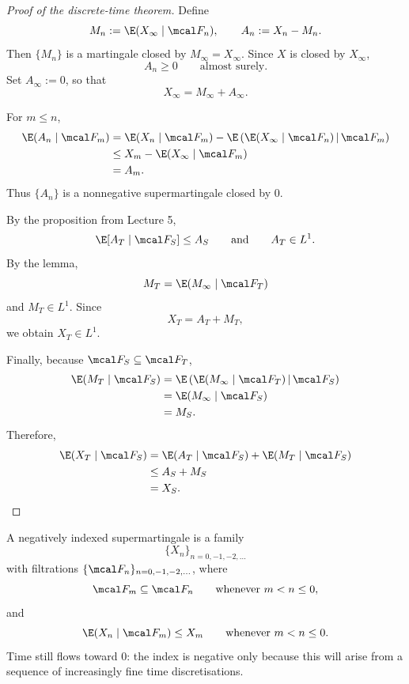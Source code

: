 \begin{proof}[Proof of the discrete-time theorem]
Define
\[
    M_n:=\E(X_\infty\mid\mcal F_n),
    \qquad
    A_n:=X_n-M_n.
\]
Then $\{M_n\}$ is a martingale closed by $M_\infty=X_\infty$. Since
$X$ is closed by $X_\infty$,
\[
    A_n\geq 0
    \qquad\text{almost surely.}
\]
Set $A_\infty:=0$, so that
\[
    X_\infty=M_\infty+A_\infty.
\]

For $m\leq n$,
\begin{align*}
    \E(A_n\mid\mcal F_m)
    &=
    \E(X_n\mid\mcal F_m)
    -
    \E\left(
        \E(X_\infty\mid\mcal F_n)
        \,\middle|\,\mcal F_m
    \right) \\
    &\leq
    X_m-\E(X_\infty\mid\mcal F_m) \\
    &=
    A_m.
\end{align*}
Thus $\{A_n\}$ is a nonnegative supermartingale closed by $0$.

By the proposition from Lecture 5,
\[
    \E[A_T\mid\mcal F_S]\leq A_S
    \qquad\text{and}\qquad
    A_T\in L^1.
\]
By the lemma,
\[
    M_T=\E(M_\infty\mid\mcal F_T)
\]
and $M_T\in L^1$. Since
\[
    X_T=A_T+M_T,
\]
we obtain $X_T\in L^1$.

Finally, because $\mcal F_S\subseteq\mcal F_T$,
\begin{align*}
    \E(M_T\mid\mcal F_S)
    &=
    \E\left(
        \E(M_\infty\mid\mcal F_T)
        \,\middle|\,\mcal F_S
    \right) \\
    &=
    \E(M_\infty\mid\mcal F_S) \\
    &=
    M_S.
\end{align*}
Therefore,
\begin{align*}
    \E(X_T\mid\mcal F_S)
    &=
    \E(A_T\mid\mcal F_S)
    +
    \E(M_T\mid\mcal F_S) \\
    &\leq A_S+M_S \\
    &=X_S.
\end{align*}
\end{proof}

\begin{definition}
A negatively indexed supermartingale is a family
\[
    \{X_n\}_{n=0,-1,-2,\ldots}
\]
with filtrations $\{\mcal F_n\}_{n=0,-1,-2,\ldots}$, where
\[
    \mcal F_m\subseteq\mcal F_n
    \qquad\text{whenever }m<n\leq 0,
\]
and
\[
    \E(X_n\mid\mcal F_m)\leq X_m
    \qquad\text{whenever }m<n\leq 0.
\]
Time still flows toward $0$: the index is negative only because this
will arise from a sequence of increasingly fine time discretisations.
\end{definition}

